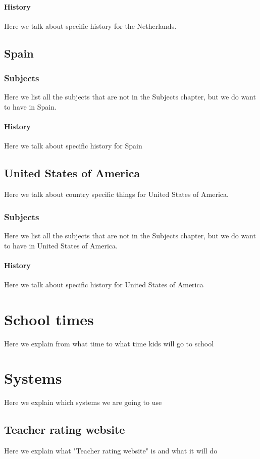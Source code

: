 \documentclass[titlepage]{article}
\begin{document}
\paragraph{History}
Here we talk about specific history for the Netherlands.

\subsection{Spain}
\subsubsection{Subjects}
Here we list all the subjects that are not in the Subjects chapter, but we do want to have in Spain.
\paragraph{History}
Here we talk about specific history for Spain

\subsection{United States of America}
Here we talk about country specific things for United States of America.
\subsubsection{Subjects}
Here we list all the subjects that are not in the Subjects chapter, but we do want to have in United States of America.
\paragraph{History}
Here we talk about specific history for United States of America

\newpage
\section{School times}
Here we explain from what time to what time kids will go to school

\newpage
\section{Systems}
Here we explain which systems we are going to use
\subsection{Teacher rating website}
Here we explain what "Teacher rating website" is and what it will do
\end{document}
